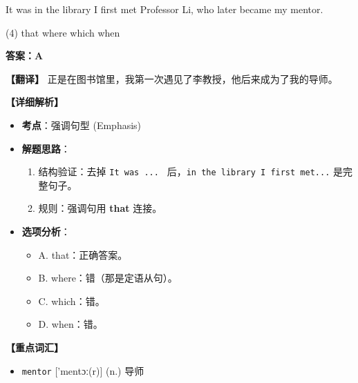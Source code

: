\documentclass[11pt, a4paper]{article}
\newcommand{\analysis}[4]{
    \begin{solutionbox}
        \textbf{答案：#1}
        
        \textbf{【翻译】} #2
        
        \textbf{【详细解析】}
        #3
        
        \textbf{【重点词汇】}
        #4
    \end{solutionbox}
}
\newcommand{\blank}{\underline{\hspace{1.5cm}}}
\begin{document}
\begin{questions}
    \item It was in the library \blank I first met Professor Li, who later became my mentor.
    \begin{tasks}(4)
        \task that \task where \task which \task when
    \end{tasks}
    \analysis{A}{正是在图书馆里，我第一次遇见了李教授，他后来成为了我的导师。}{
        \begin{itemize}
            \item \textbf{考点}：强调句型 (Emphasis)
            \item \textbf{解题思路}：
                \begin{enumerate}
                    \item 结构验证：去掉 \texttt{It was ... \blank} 后，\texttt{in the library I first met...} 是完整句子。
                    \item 规则：强调句用 \textbf{that} 连接。
                \end{enumerate}
            \item \textbf{选项分析}：
                \begin{itemize}
                    \item A. that：正确答案。
                    \item B. where：错（那是定语从句）。
                    \item C. which：错。
                    \item D. when：错。
                \end{itemize}
        \end{itemize}
    }{
        \begin{itemize}
            \item \texttt{mentor} ['mentɔː(r)] (n.) 导师
        \end{itemize}
    }


\end{questions}
\end{document}
